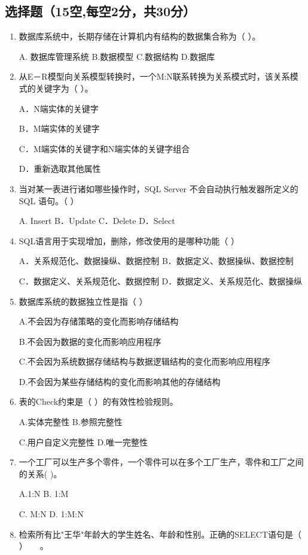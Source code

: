 \documentclass{article}
\begin{document}
\subsection{选择题（15空,每空2分，共30分）}
\begin{enumerate}
\item 数据库系统中，长期存储在计算机内有结构的数据集合称为（ ）。

A. 数据库管理系统 B.数据模型 C.数据结构 D.数据库

\item 从E－R模型向关系模型转换时，一个M:N联系转换为关系模式时，该关系模式的关键字为（ ）。

A．N端实体的关键字

B．M端实体的关键字

C．M端实体的关键字和N端实体的关键字组合

D．重新选取其他属性

\item 当对某一表进行诸如哪些操作时，SQL Server 不会自动执行触发器所定义的SQL 语句。（ ）

A. Insert B．Update C．Delete D．Select

\item SQL语言用于实现增加，删除，修改使用的是哪种功能（ ）

A．关系规范化、数据操纵、数据控制 B．数据定义、数据操纵、数据控制

C．数据定义、关系规范化、数据控制 D．数据定义、关系规范化、数据操纵

\item 数据库系统的数据独立性是指（ ）

A.不会因为存储策略的变化而影响存储结构

B.不会因为数据的变化而影响应用程序

C.不会因为系统数据存储结构与数据逻辑结构的变化而影响应用程序

D.不会因为某些存储结构的变化而影响其他的存储结构

\item 表的Check约束是（ ）的有效性检验规则。

A.实体完整性 B.参照完整性

C.用户自定义完整性 D.唯一完整性

\item 一个工厂可以生产多个零件，一个零件可以在多个工厂生产，零件和工厂之间的关系( )。

A.1:N B. 1:M

C. M:N D. 1:M:N

\item 检索所有比"王华"年龄大的学生姓名、年龄和性别。正确的SELECT语句是（ ）　　。


\end{enumerate}
\end{document}
